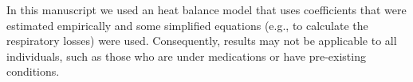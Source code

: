 In this manuscript we used an heat balance model that uses coefficients that were estimated empirically and some simplified equations (e.g., to calculate the respiratory losses) were used.
Consequently, results may not be applicable to all individuals, such as those who are under medications or have pre-existing conditions.
